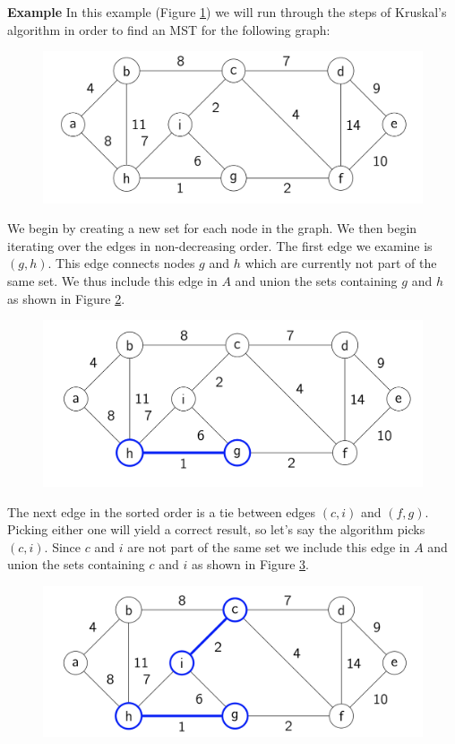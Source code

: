 \documentclass [12pt]{article}
\theoremstyle{definition}
\begin{document}
\textbf{Example} In this example (Figure \ref{fig:kruskal0}) we will run through the steps of Kruskal's algorithm in order to find an MST for the following graph:


\begin{figure}[h!]
\centering
\includegraphics[scale=0.8]{kruskal0.png}
\caption{}
\label{fig:kruskal0}
\end{figure}
 
We begin by creating a new set for each node in the graph. We then begin iterating over the edges in non-decreasing order. The first edge we examine is $(g, h)$. This edge connects nodes $g$ and $h$ which are currently not part of the same set. We thus include this edge in $A$ and union the sets containing $g$ and $h$ as shown in Figure \ref{fig:kruskal1}.

\begin{figure}[h!]
\centering
\includegraphics[scale=0.8]{kruskal1.png}
\caption{}
\label{fig:kruskal1}
\end{figure}

The next edge in the sorted order is a tie between edges $(c, i)$ and $(f , g)$. Picking either one will yield a correct result, so let's say the algorithm picks $(c, i)$. Since $c$ and $i$ are not part of the same set we include this edge in $A$ and union the sets containing $c$ and $i$ as shown in Figure \ref{fig:kruskal2}.

\begin{figure}[h!]
\centering
\includegraphics[scale=0.8]{kruskal2.png}
\caption{}
\label{fig:kruskal2}
\end{figure}
\end{document}
